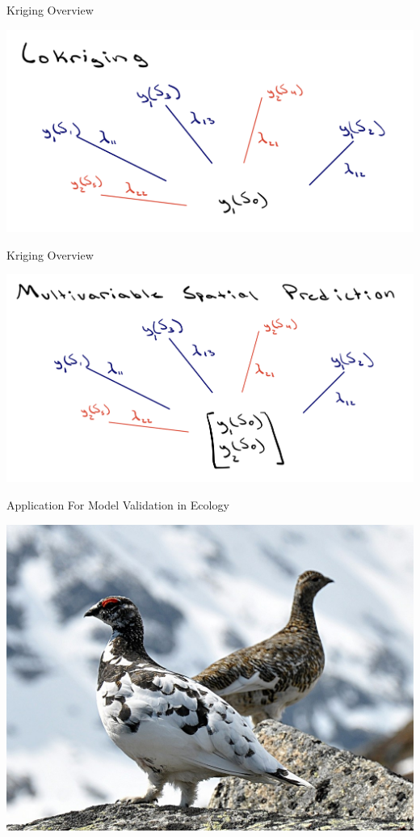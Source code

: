 \documentclass[10pt]{beamer}
\begin{document}
\begin{frame}{Kriging Overview}
    \begin{center}
    \includegraphics[width = .9\textwidth]{Cokriging.png}
\end{center}
\end{frame}

\begin{frame}{Kriging Overview}
    \begin{center}
    \includegraphics[width = .9\textwidth]{MultivariableSpatialPrediction.png}
\end{center}
\end{frame}


\begin{frame}{Application For Model Validation in Ecology}
    \begin{center}
    \includegraphics[width = .9\textwidth]{RockPtarmigan.jpg}
\end{center}
\end{frame}
\end{document}
